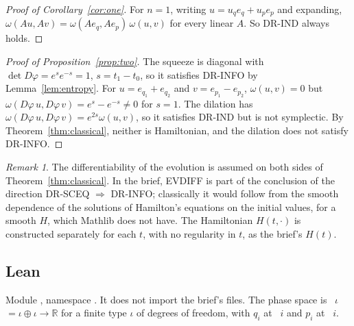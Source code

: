 \documentclass[11pt]{article}
\theoremstyle{definition}
\theoremstyle{remark}
\newtheorem{remark}[theorem]{Remark}
\begin{document}
\begin{proof}[Proof of Corollary~\ref{cor:one}]
  For $n = 1$, writing $u = u_q e_q + u_p e_p$ and expanding,
  $\omega(Au, Av) = \omega(Ae_q, Ae_p)\,\omega(u, v)$ for every linear $A$. So DR-IND always holds.
\end{proof}

\begin{proof}[Proof of Proposition~\ref{prop:two}]
  The squeeze is diagonal with $\det D\varphi = e^{s}e^{-s} = 1$, $s = t_1 - t_0$, so it satisfies
  DR-INFO by Lemma~\ref{lem:entropy}. For $u = e_{q_1} + e_{q_2}$ and $v = e_{p_1} - e_{p_2}$,
  $\omega(u, v) = 0$ but $\omega(D\varphi\,u, D\varphi\,v) = e^{s} - e^{-s} \ne 0$ for $s = 1$.
  The dilation has $\omega(D\varphi\,u, D\varphi\,v) = e^{2s}\omega(u, v)$, so it satisfies
  DR-IND but is not symplectic. By Theorem~\ref{thm:classical}, neither is Hamiltonian, and the
  dilation does not satisfy DR-INFO.
\end{proof}

\begin{remark}
  The differentiability of the evolution is assumed on both sides of Theorem~\ref{thm:classical}.
  In the brief, EVDIFF is part of the conclusion of the direction DR-SCEQ $\Rightarrow$ DR-INFO;
  classically it would follow from the smooth dependence of the solutions of Hamilton's equations
  on the initial values, for a smooth $H$, which Mathlib does not have. The Hamiltonian
  $H(t, \cdot)$ is constructed separately for each $t$, with no regularity in $t$, as the
  brief's $H(t)$.
\end{remark}

\subsection{Lean}

Module , namespace
. It does not import the brief's files. The phase space is
~$\iota$ $= \iota \oplus \iota \to \mathbb R$ for a finite type $\iota$ of degrees
of freedom, with $q_i$ at ~$i$ and $p_i$ at ~$i$.
\end{document}
